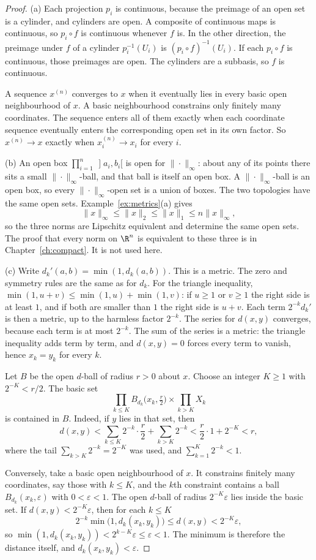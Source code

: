 \begin{proof}
(a) Each projection $p_i$ is continuous, because the preimage of an open set is a cylinder, and cylinders are open. A composite of continuous maps is continuous, so $p_i\circ f$ is continuous whenever $f$ is. In the other direction, the preimage under $f$ of a cylinder $p_i^{-1}(U_i)$ is $(p_i\circ f)^{-1}(U_i)$. If each $p_i\circ f$ is continuous, those preimages are open. The cylinders are a subbasis, so $f$ is continuous.

A sequence $x^{(n)}$ converges to $x$ when it eventually lies in every basic open neighbourhood of $x$. A basic neighbourhood constrains only finitely many coordinates. The sequence enters all of them exactly when each coordinate sequence eventually enters the corresponding open set in its own factor. So $x^{(n)}\to x$ exactly when $x^{(n)}_i\to x_i$ for every $i$.

(b) An open box $\prod_{i=1}^n\,\mathopen]a_i,b_i[$ is open for $\|\cdot\|_\infty$: about any of its points there sits a small $\|\cdot\|_\infty$-ball, and that ball is itself an open box. A $\|\cdot\|_\infty$-ball is an open box, so every $\|\cdot\|_\infty$-open set is a union of boxes. The two topologies have the same open sets. Example~\ref{ex:metrics}(a) gives
\[
\|x\|_\infty\le\|x\|_2\le\|x\|_1\le n\|x\|_\infty,
\]
so the three norms are Lipschitz equivalent and determine the same open sets. The proof that every norm on $\R^n$ is equivalent to these three is in Chapter~\ref{ch:compact}. It is not used here.

(c) Write $d_k'(a,b)=\min(1,d_k(a,b))$. This is a metric. The zero and symmetry rules are the same as for $d_k$. For the triangle inequality, $\min(1,u+v)\le\min(1,u)+\min(1,v)$: if $u\ge1$ or $v\ge1$ the right side is at least $1$, and if both are smaller than $1$ the right side is $u+v$. Each term $2^{-k}d_k'$ is then a metric, up to the harmless factor $2^{-k}$. The series for $d(x,y)$ converges, because each term is at most $2^{-k}$. The sum of the series is a metric: the triangle inequality adds term by term, and $d(x,y)=0$ forces every term to vanish, hence $x_k=y_k$ for every $k$.

Let $B$ be the open $d$-ball of radius $r>0$ about $x$. Choose an integer $K\ge1$ with $2^{-K}<r/2$. The basic set
\[
\prod_{k\le K}B_{d_k}\bigl(x_k,\tfrac r2\bigr)\times\prod_{k>K}X_k
\]
is contained in $B$. Indeed, if $y$ lies in that set, then
\[
d(x,y)<\sum_{k\le K}2^{-k}\cdot\frac r2+ \sum_{k>K}2^{-k}
<\frac r2\cdot 1 + 2^{-K}<r,
\]
where the tail $\sum_{k>K}2^{-k}=2^{-K}$ was used, and $\sum_{k=1}^{K}2^{-k}<1$.

Conversely, take a basic open neighbourhood of $x$. It constrains finitely many coordinates, say those with $k\le K$, and the $k$th constraint contains a ball $B_{d_k}(x_k,\varepsilon)$ with $0<\varepsilon<1$. The open $d$-ball of radius $2^{-K}\varepsilon$ lies inside the basic set. If $d(x,y)<2^{-K}\varepsilon$, then for each $k\le K$
\[
2^{-k}\min\bigl(1,d_k(x_k,y_k)\bigr)\le d(x,y)<2^{-K}\varepsilon,
\]
so $\min(1,d_k(x_k,y_k))<2^{k-K}\varepsilon\le\varepsilon<1$. The minimum is therefore the distance itself, and $d_k(x_k,y_k)<\varepsilon$.
\end{proof}

